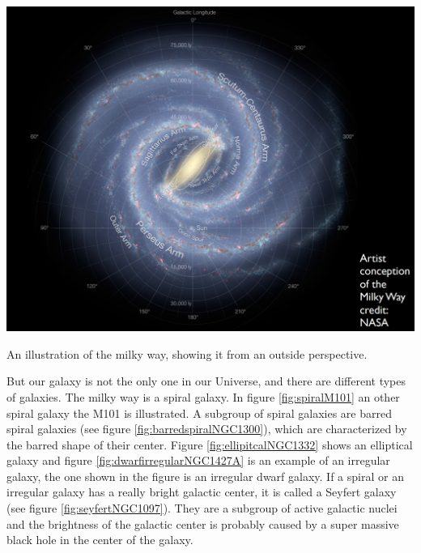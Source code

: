 \begin{marginfigure}
	\centering
		\includegraphics[width=\textwidth]{img/ch-01/milkywayfromoutside.png}
		\caption{An illustration of the milky way, showing it from an outside perspective.}
		\label{fig:milkywayoutside}
\end{marginfigure}
But our galaxy is not the only one in our Universe, and there are different types of galaxies. The milky way is a spiral galaxy. In figure \ref{fig:spiralM101} an other spiral galaxy the M101 is illustrated. A subgroup of spiral galaxies are barred spiral galaxies (see figure \ref{fig:barredspiralNGC1300}), which are characterized by the barred shape of their center. Figure \ref{fig:ellipitcalNGC1332} shows an elliptical galaxy and figure \ref{fig:dwarfirregularNGC1427A} is an example of an irregular galaxy, the one shown in the figure is an irregular dwarf galaxy. If a spiral or an irregular galaxy has a really bright galactic center, it is called a Seyfert galaxy (see figure \ref{fig:seyfertNGC1097}). They are a subgroup of active galactic nuclei and the brightness of the galactic center is probably caused by a super massive black hole in the center of the galaxy. 
